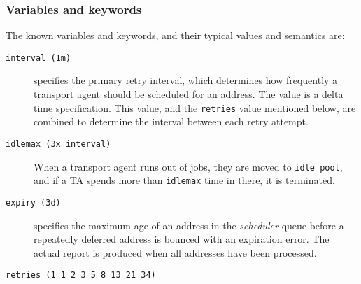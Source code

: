 \subsubsection{Variables and keywords}

The known variables and keywords, and their typical values and semantics are:
\begin{description}
\item[{\tt interval (1m)}] \mbox{}

specifies the primary retry interval, which 
determines how frequently a transport agent should be scheduled for an address. 
The value is a delta time specification. This value, and the {\tt retries}
value mentioned below, are combined to determine the interval between
each retry attempt.



\item[{\tt idlemax (3x interval)}] \mbox{}

When a transport agent runs out of jobs, 
they are moved to {\tt idle pool}, and if a TA spends more than 
{\tt idlemax} time in there, it is terminated.



\item[{\tt expiry (3d)}] \mbox{}

specifies the maximum age of an address in the 
{\em scheduler\/} queue before a repeatedly deferred address is bounced 
with an expiration error. The actual report is produced when all addresses 
have been processed.



\item[{\tt retries (1 1 2 3 5 8 13 21 34)}] \mbox{}


\end{description}
